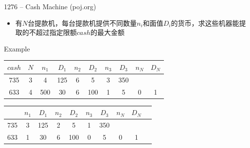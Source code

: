 \begin{frame}{1276 -- Cash Machine (poj.org)}
    \begin{itemize}
        \item 有$N$台提款机，每台提款机提供不同数量$n_i$和面值$D_i$的货币，求这些机器能提取的不超过指定限额$cash$的最大金额
    \end{itemize}
    \vfill
    \begin{exampleblock}{Example}
        \begin{table}
            \begin{tabular}{cccccccccc}
                $cash$ & $N$    & $n_1$   & $D_1$   & $n_2$   & $D_2$   & $n_3$   & $D_3$   & $n_N$   & $D_N$  \\\hline
                735  & 3    & 4    & 125  & 6    & 5    & 3    & 350  &      &    \\\hline
                633  & 4    & 500  & 30   & 6    & 100  & 1    & 5    & 0    & 1  \\\hline
            \end{tabular}
        \end{table}
        \begin{table}
            \begin{tabular}{cccccccccc}
                 & $n_1$   & $D_1$   & $n_2$   & $D_2$   & $n_3$   & $D_3$   & $n_N$   & $D_N$  \\\hline
                735  & 3  & 125  & 2    & 5    & 1    & 350  &      &    \\\hline
                633  & 1  & 30   & 6    & 100  & 0    & 5    & 0    & 1  \\\hline
            \end{tabular}
        \end{table}  
    \end{exampleblock}
\end{frame}  
